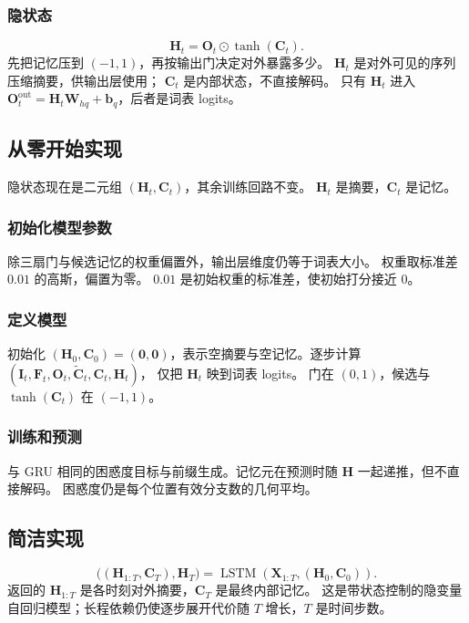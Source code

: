 \subsubsection{隐状态}

\[
\bm{H}_t=\bm{O}_t\odot\tanh(\bm{C}_t).
\]
先把记忆压到 $(-1,1)$，再按输出门决定对外暴露多少。
$\bm{H}_t$ 是对外可见的序列压缩摘要，供输出层使用；
$\bm{C}_t$ 是内部状态，不直接解码。
只有 $\bm{H}_t$ 进入 $\bm{O}_t^{\text{out}}=\bm{H}_t\bm{W}_{hq}+\bm{b}_q$，后者是词表 logits。

\subsection{从零开始实现}

隐状态现在是二元组 $(\bm{H}_t,\bm{C}_t)$，其余训练回路不变。
$\bm{H}_t$ 是摘要，$\bm{C}_t$ 是记忆。

\subsubsection{初始化模型参数}

除三扇门与候选记忆的权重偏置外，输出层维度仍等于词表大小。
权重取标准差 $0.01$ 的高斯，偏置为零。
$0.01$ 是初始权重的标准差，使初始打分接近 $0$。

\subsubsection{定义模型}

初始化 $(\bm{H}_0,\bm{C}_0)=(\bm{0},\bm{0})$，表示空摘要与空记忆。逐步计算
$(\bm{I}_t,\bm{F}_t,\bm{O}_t,\tilde{\bm{C}}_t,\bm{C}_t,\bm{H}_t)$，
仅把 $\bm{H}_t$ 映到词表 logits。
门在 $(0,1)$，候选与 $\tanh(\bm{C}_t)$ 在 $(-1,1)$。

\subsubsection{训练和预测}

与 GRU 相同的困惑度目标与前缀生成。记忆元在预测时随 $\bm{H}$ 一起递推，但不直接解码。
困惑度仍是每个位置有效分支数的几何平均。

\subsection{简洁实现}

\[
\bigl((\bm{H}_{1:T},\bm{C}_T),\bm{H}_T\bigr)
=
\operatorname{LSTM}(\bm{X}_{1:T},(\bm{H}_0,\bm{C}_0)).
\]
返回的 $\bm{H}_{1:T}$ 是各时刻对外摘要，$\bm{C}_T$ 是最终内部记忆。
这是带状态控制的隐变量自回归模型；长程依赖仍使逐步展开代价随 $T$ 增长，$T$ 是时间步数。

